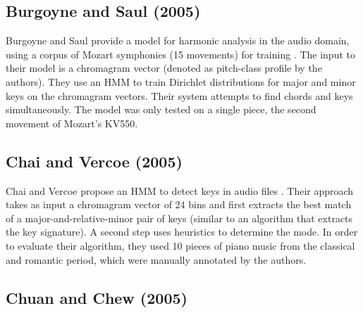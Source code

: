 \subsection{Burgoyne and Saul (2005)}
Burgoyne and Saul provide a model for harmonic analysis in the audio domain, using a corpus of Mozart symphonies (15 movements) for training \cite{burgoyne2005learning}. The input to their model is a chromagram vector (denoted as pitch-class profile by the authors). They use an HMM to train Dirichlet distributions for major and minor keys on the chromagram vectors. Their system attempts to find chords and keys simultaneously. The model was only tested on a single piece, the second movement of Mozart's KV550.

\subsection{Chai and Vercoe (2005)}
Chai and Vercoe propose an HMM to detect keys in audio files \cite{chai2005detection}. Their approach takes as input a chromagram vector of 24 bins and first extracts the best match of a major-and-relative-minor pair of keys (similar to an algorithm that extracts the key signature). A second step uses heuristics to determine the mode. In order to evaluate their algorithm, they used 10 pieces of piano music from the classical and romantic period, which were manually annotated by the authors.

\subsection{Chuan and Chew (2005)}

